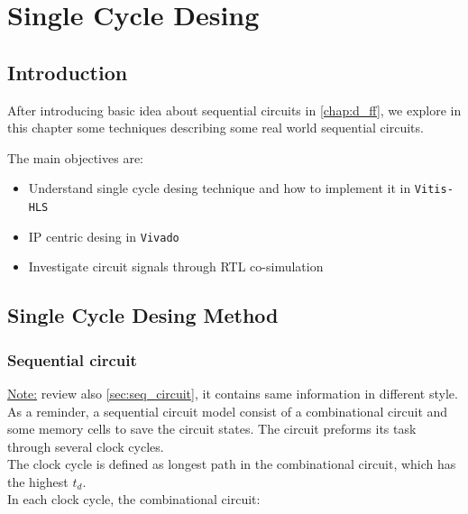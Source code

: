 

\chapter{Single Cycle Desing}
\label{chap:single_desing_flow}

\section{Introduction}

After introducing basic idea about sequential circuits in \autoref{chap:d_ff}, we explore in this chapter some techniques describing some real world sequential circuits.

The main objectives are:

\begin{itemize}	

\item Understand single cycle desing technique and how to implement it in \verb|Vitis-HLS|

\item IP centric desing in \verb|Vivado|

\item Investigate circuit signals through RTL co-simulation

\end{itemize}


\newpage
\section{Single Cycle Desing Method}

\subsection{Sequential circuit}

\underline{Note:} review also \ref{sec:seq_circuit}, it contains same information in different style.\\

As a reminder, a sequential circuit model consist of a combinational circuit and some memory cells to save the circuit states. The circuit preforms its task through several clock cycles. \\

The clock cycle is defined as longest path in the combinational circuit, which has the highest $t_d$.\\

In each clock cycle, the combinational circuit:

